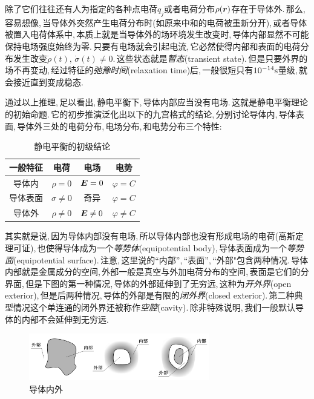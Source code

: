 除了它们往往还有人为指定的各种点电荷$q_j$或者电荷分布$\rho(\boldsymbol{r})$存在于导体外.\,那么,\,容易想像,\,当导体外突然产生电荷分布时(如原来中和的电荷被重新分开),\,或者导体被置入电荷体系中,\,本质上就是当导体外的场环境发生改变时,\,导体内部显然不可能保持电场强度始终为零.\,只要有电场就会引起电流,\,它必然使得内部和表面的电荷分布发生改变$\dot{\rho}(t),\,\dot{\sigma}(t)\neq 0$.\,这些状态就是\emph{暂态}(transient state).\,但是只要外界的场不再变动,\,经过特征的\emph{弛豫时间}(relaxation time)后,\,一般很短只有$10^{-14}{\rm s}$量级,\,就会接近直到变成稳态.

通过以上推理,\,足以看出,\,静电平衡下,\,导体内部应当没有电场.\,这就是静电平衡理论的初始命题.\,它的初步推演泛化出以下的九宫格式的结论,\,分别讨论导体内,\,导体表面,\,导体外三处的电荷分布,\,电场分布,\,和电势分布三个特性:

\begin{table}[H]
\centering
\begin{tabular}{|c||c|c|c|}
\hline
一般特征	&电荷		  		&电场&电势\\
\hline\hline
导体内 		&$\rho = 0$			&$\boldsymbol{E} = 0$	&$\varphi=C$\\
\hline
导体表面	&$\sigma\neq 0$ 	&奇异			&$\varphi=C$\\
\hline
导体外 		&$\rho \neq 0$ 	&$\boldsymbol{E} \neq 0$&$\varphi\neq C$\\
\hline
\end{tabular}
\caption{静电平衡的初级结论}
\end{table}

其实就是说,\,因为导体内部没有电场,\,所以导体内部也没有形成电场的电荷(高斯定理可证),\,也使得导体成为一个\emph{等势体}(equipotential body),\,导体表面成为一个\emph{等势面}(equipotential surface).\,注意,\,这里说的``内部'',\,``表面'',\,``外部"包含两种情况.\,导体内部就是金属成分的空间,\,外部一般是真空与外加电荷分布的空间,\,表面是它们的分界面,\,但是下图的第一种情况,\,导体的外部延伸到了无穷远,\,这种为\emph{开外界}(open exterior),\,但是后两种情况,\,导体的外部是有限的\emph{闭外界}(closed exterior).\,第二种典型情况这个单连通的闭外界还被称作\emph{空腔}(cavity).\,除非特殊说明,\,我们一般默认导体的内部不会延伸到无穷远.

\begin{figure}[H]
\centering
\includegraphics[width=0.7\textwidth]{image/7-2-2.png}
\caption{导体内外}
\end{figure}

